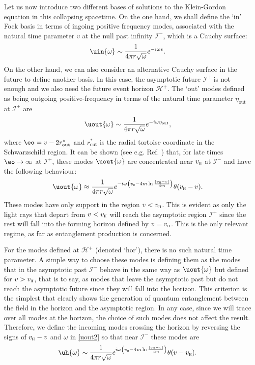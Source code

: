 Let us now introduce two different bases of solutions to the
Klein-Gordon equation in this collapsing spacetime. On the one hand, we
shall define the `in' Fock basis in terms of ingoing positive frequency
modes, associated with the natural time parameter $v$ at the null past
infinity $\mathscr{I}^-$, which is a Cauchy surface:
\begin{equation}
\uin{\omega}\sim\frac{1}{4\pi r\sqrt{\omega}}e^{-i\omega v}.
\end{equation}
On the other hand, we can also consider an alternative Cauchy surface in
the future to define another basis. In this case, the asymptotic future
$\mathscr{I}^+$ is not enough and we also need the future event horizon
$\mathscr{H}^+$. The `out' modes defined as being outgoing
positive-frequency in terms  of the natural time parameter
$\eta_{\text{out}}$ at  $\mathscr{I}^+$ are
\begin{equation}
\uout{\omega}\sim\frac{1}{4\pi r\sqrt{\omega}}e^{-i\omega \eta_{\text{out}}},
\end{equation}
where $\eo=v-2r^*_{\text{out}}$ and $r^*_\text{out}
$ is the radial tortoise coordinate in the Schwarzschild region.  It can be
shown (see e.g. Ref. \cite{NavarroSalas}) that, for late times
$\eo\to\infty$ at $\mathscr{I}^+$, these modes $\uout{\omega}$ are
concentrated near $v_\textsc{h}$ at $\mathscr{I}^-$ and have the
following behaviour:
\begin{equation}\label{uout2}
\uout{\omega}\approx\frac{1}{4\pi r \sqrt{\omega}}
e^{-i\omega\left(v_\textsc{h}-4m\ln\frac{|v_\textsc{h}-v|}{4m}\right)}
\theta(v_\textsc{h}-v).
\end{equation}
These modes have only support in the region $v < v_\textsc{h}$. This is
evident as only the light rays that depart from $v < v_\textsc{h}$ will
reach the asymptotic region $\mathscr{I}^+$ since the rest will fall into
the forming horizon defined by $v=v_\textsc{h}$. This is the only
relevant regime, as far as entanglement production is concerned.

For the modes defined at  $\mathscr{H}^+$ (denoted `hor'), there is no such
natural time parameter. A simple way to choose these modes is defining
them as the modes that in the asymptotic past $\mathscr{I}^-$ behave in
the same way as $\uout{\omega}$ but defined for $v > v_\textsc{h}$,
that is to say, as modes that leave the asymptotic past but do not reach
the asymptotic future  since they will fall into the horizon. This criterion
is the simplest that clearly shows the generation of quantum
entanglement between the field in the horizon and the asymptotic region.
In any case, since we will trace over all modes at the horizon, the choice
of such modes does not affect the result. Therefore, we define the
incoming modes crossing the horizon  by reversing the signs of
$v_\textsc{h}-v$ and $\omega$ in
\eqref{uout2} so that near $\mathscr{I}^-$ these modes are
\begin{equation}
\uh{\omega}\sim\frac{1}{4\pi r \sqrt{\omega}}
e^{i\omega\left(v_\textsc{h}-4m\ln\frac{|v_\textsc{h}-v|}{4m}\right)}
\theta(v-v_\textsc{h}).
\end{equation}

